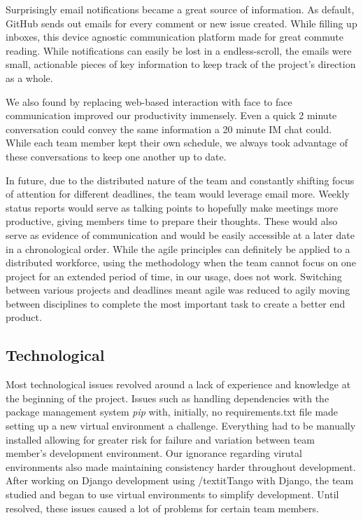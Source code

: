 \documentclass{l3proj}
\begin{document}
Surprisingly email notifications became a great source of information. As
default, GitHub sends out emails for every comment or new issue created. While
filling up inboxes, this device agnostic communication platform made for great
commute reading. While notifications can easily be lost in a endless-scroll, the
emails were small, actionable pieces of key information to keep track of the
project's direction as a whole.

We also found by replacing web-based interaction with face to face communication improved our productivity immensely. Even a quick 2 minute conversation could convey the same information a 20 minute IM chat could. While each team member kept their own schedule, we always took advantage of these conversations to keep one another up to date.

In future, due to the distributed nature of the team and constantly shifting
focus of attention for different deadlines, the team would leverage email more.
Weekly status reports would serve as talking points to hopefully make meetings
more productive, giving members time to prepare their thoughts. These would also
serve as evidence of communication and would be easily accessible at a later
date in a chronological order. While the agile principles can definitely be applied to a distributed workforce, using the methodology when the team cannot focus on one project for an extended period of time, in our usage, does not work. Switching between various projects and deadlines meant agile was reduced to agily moving between disciplines to complete the most important task to create a better end product.

\subsection{Technological}
Most technological issues revolved around a lack of experience and knowledge at
the beginning of the project. Issues such as handling dependencies with the package management system \textit{pip} with, initially, no requirements.txt file made setting up a new virtual environment a challenge. Everything had to be manually installed allowing for greater risk for failure and variation between team member's development environment. Our ignorance regarding virutal environments also made maintaining consistency harder throughout development. After working on Django development using /textit{Tango with Django}, the team studied and began to use virtual environments to simplify development. Until resolved, these issues caused a lot of problems for certain team members.
\end{document}
